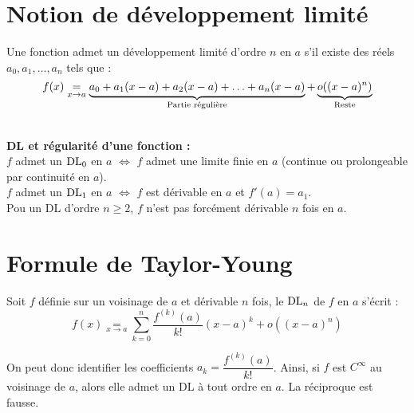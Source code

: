 \section{Notion de développement limité}

Une fonction admet un développement limité d'ordre $n$ en $a$ s'il existe des réels $a_0, a_1, \ldots, a_n$ tels que :\\
\[f(x) \underset{x \rightarrow a}{=} \underbrace{a_0 + a_1 (x - a) + a_2 (x - a) + \ldots + a_n (x - a)}_\textrm{Partie régulière} + \underbrace{o((x - a)^n)}_\textrm{Reste}\]

\vspace{7pt}\\
\textbf{DL et régularité d'une fonction :}\\
$f$ admet un $\textrm{DL}_0$ en $a$ $\iff$ $f$ admet une limite finie en $a$ (continue ou prolongeable par continuité en $a$).\\
$f$ admet un $\textrm{DL}_1$ en $a$ $\iff$ $f$ est dérivable en $a$ et $f'(a) = a_1$.\\
Pou un DL d'ordre $n \ge 2$, $f$ n'est pas forcément dérivable $n$ fois en $a$.\\


\section{Formule de Taylor-Young}

Soit $f$ définie sur un voisinage de $a$ et dérivable $n$ fois, le $\textrm{DL}_n$ de $f$ en $a$ s'écrit :\\
\[f(x) \underset{x \rightarrow a}{=} \sum_{k=0}^n \frac{f^{(k)}(a)}{k!} (x - a)^k + o((x - a)^n)\]

On peut donc identifier les coefficients $a_k = \dfrac{f^{(k)}(a)}{k!}$. Ainsi, si $f$ est $C^\infty$ au voisinage de $a$, alors elle admet un DL à tout ordre en $a$. La réciproque est fausse.\\

